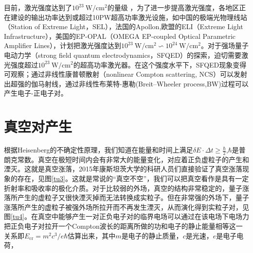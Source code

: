 目前，激光强度达到了$ 10^{23}~\mathrm{W/cm^{2}}$的量级 \cite{2021jiguang}，为了进一步提高激光强度，各地区正在建设的输出功率达到或超过10PW超高功率激光设施，如中国的极端光物理线站（Station of Extreme Light，SEL）\cite{2018SEL}，法国的Apollon\cite{2015Apollon},欧盟的ELI（Extreme Light Infrastructure）\cite{2018ELI}，美国的EP-OPAL（OMEGA EP-coupled Optical Parametric Amplifier Lines）\cite{2019OP}，计划把激光强度达到$10^{23}~\mathrm{W/cm^{2}}\backsim 10^{24}~\mathrm{W/cm^{2}} $。对于强场量子电动力学（strong field quantum electrodynamics，SFQED）的探索，迫切需要激光强度超过$ 10^{23}~\mathrm{W/cm^{2}}$的超高功率激光器\cite{2019jiguan,2020jiguan}。在这个强度水平下，SFQED现象变得可观察；通过非线性康普顿散射（nonlinear Compton scattering, NCS）可以发射出超强的伽马射线，通过非线性布莱特-惠勒(Breit–Wheeler process,BW)过程可以产生电子-正电子对\cite{2006dzheng,2012zheng,2018zheng,2022zheng}。

\section{真空对产生}

根据Heisenberg的不确定性原理，我们知道在能量和时间上满足$\delta E \cdotp \Delta t \ge \frac{\hbar}{2}$,$\hbar$是普朗克常数。真空在极短时间内会有非常大的能量变化，对应着正负虚粒子的产生和湮灭。这就是真空涨落，2015年康斯坦茨大学的科研人员们直接验证了真空涨落现象的存在\cite{2015f}，见图\ref{tu3}。这就是常说的“真空不空”，我们可以把真空看作是具有一定折射率和吸收率的极化介质。对于比较弱的外场，真空的结构非常稳定的，量子涨落所产生的虚粒子又很快湮灭掉而无法转换成实粒子。但在非常强的外场下，量子涨落所产生的虚粒子被强外场所拉开而不再发生湮灭，从而演化得到实粒子对，见图\ref{tu4}。在真空中能够产生一对正负电子对的临界电场可以通过在该电场下电场力把正负电子对拉开一个Compton波长的距离所做的功和电子的静止能量相等这一关系即$E_{\mathrm{cr}}=m^2c^{3} / e \hbar$估算出来，其中$m$是电子的静止质量，$c$是光速，$e$是电子电荷，

